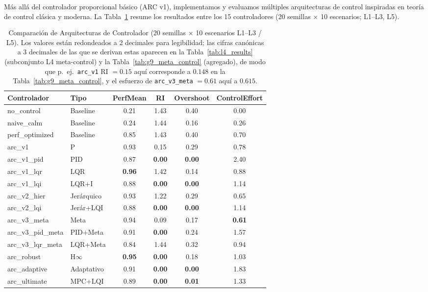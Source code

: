 \documentclass{article}
\begin{document}
Más allá del controlador proporcional básico (ARC v1), implementamos y evaluamos múltiples arquitecturas de control inspiradas en teoría de control clásica y moderna. La Tabla~\ref{tab:controller_comparison} resume los resultados entre los 15 controladores (20 semillas $\times$ 10 escenarios; L1--L3, L5).

\begin{table}[htbp]
\centering
\caption{Comparación de Arquitecturas de Controlador (20 semillas $\times$ 10 escenarios L1--L3 / L5). Los valores están redondeados a 2 decimales para legibilidad; las cifras canónicas a 3 decimales de las que se derivan estas aparecen en la Tabla~\ref{tab:l4_results} (subconjunto L4 meta-control) y la Tabla~\ref{tab:g9_meta_control} (agregado), de modo que p.\ ej.\ \texttt{arc\_v1} RI $=0.15$ aquí corresponde a $0.148$ en la Tabla~\ref{tab:g9_meta_control}, y el esfuerzo de \texttt{arc\_v3\_meta} $=0.61$ aquí a $0.615$.}
\label{tab:controller_comparison}
\footnotesize
\begin{adjustbox}{max width=0.88\textwidth}
\begin{tabular}{@{}llcccc@{}}
\toprule
Controlador & Tipo & PerfMean & RI & Overshoot & ControlEffort \\ \midrule
no\_control & Baseline & 0.21 & 1.43 & 0.40 & 0.00 \\
naive\_calm & Baseline & 0.24 & 1.44 & 0.16 & 0.26 \\
perf\_optimized & Baseline & 0.85 & 1.43 & 0.40 & 0.70 \\
arc\_v1 & P & 0.93 & 0.15 & 0.29 & 0.78 \\
arc\_v1\_pid & PID & 0.87 & \textbf{0.00} & \textbf{0.00} & 2.40 \\
arc\_v1\_lqr & LQR & \textbf{0.96} & 1.42 & 0.14 & 0.88 \\
arc\_v1\_lqi & LQR+I & 0.88 & \textbf{0.00} & \textbf{0.00} & 1.14 \\
arc\_v2\_hier & Jerárquico & 0.93 & 1.22 & 0.29 & 0.65 \\
arc\_v2\_lqi & Jerár+LQI & 0.88 & \textbf{0.00} & \textbf{0.00} & 1.14 \\
arc\_v3\_meta & Meta & 0.94 & 0.09 & 0.17 & \textbf{0.61} \\
arc\_v3\_pid\_meta & PID+Meta & 0.91 & \textbf{0.00} & 0.24 & 1.57 \\
arc\_v3\_lqr\_meta & LQR+Meta & 0.84 & 1.44 & 0.32 & 0.94 \\
arc\_robust & H$\infty$ & \textbf{0.95} & \textbf{0.00} & 0.18 & 1.03 \\
arc\_adaptive & Adaptativo & 0.91 & \textbf{0.00} & \textbf{0.00} & 1.83 \\
arc\_ultimate & MPC+LQI & 0.89 & \textbf{0.00} & \textbf{0.01} & 1.33 \\ \bottomrule
\end{tabular}
\end{adjustbox}
\end{table}
\end{document}
